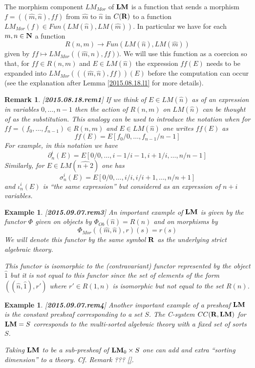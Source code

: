 \documentclass[11pt]{article}
\newtheorem{example}[proposition]{Example}
\newtheorem{remark}[proposition]{Remark}
\newcommand{\llabel}[1]{\label{#1}[{\bf #1}]}
\newcommand{\sr}{\rightarrow}
\newcommand{\nn}{{\bf N\rm}}
\newcommand{\nat}{\nn}
\newcommand{\rr}{{\bf R}}
\newcommand{\lm}{{\bf LM}}
\newcommand{\wh}{\widehat}
\begin{document}
The morphism component $LM_{Mor}$ of $\lm$ is a function that sends a morphism $f=((\wh{m},\wh{n}),ff)$ from $\wh{m}$ to $\wh{n}$ in $C(\rr)$ to a function $LM_{Mor}(f)\in Fun(LM(\wh{n}),LM(\wh{m}))$. In particular we have for each $m,n\in\nat$ a function
%
$$R(n,m)\sr Fun(LM(\wh{n}),LM(\wh{m}))$$
%
given by $ff\mapsto LM_{Mor}((\wh{m},\wh{n}),ff))$. We will use this function as a coercion so that, for $ff\in R(n,m)$ and $E\in LM(\wh{n})$ the expression $ff(E)$ needs to be expanded into $LM_{Mor}(((\wh{m},\wh{n}),ff))(E)$ before the computation can occur (see the explanation after Lemma \ref{2015.08.18.l1} for more details). 
\begin{remark}\rm
\llabel{2015.08.18.rem1}
If we think of $E\in LM(\wh{n})$ as of an expression in variables $0,\dots,n-1$ then the action of $R(n,m)$ on $LM(\wh{n})$ can be thought of as the substitution. This analogy can be used to introduce the notation when for $ff=(f_0,\dots,f_{n-1})\in R(n,m)$ and $E\in LM(\wh{n})$ one writes $ff(E)$ as 
%
$$ff(E)=E[f_0/0,\dots,f_{n-1}/n-1]$$
%
For example, in this notation we have 
%
$$\partial^i_n(E)=E[0/0,\dots,i-1/i-1,i+1/i,\dots,n/n-1]$$
%
Similarly, for $E\in LM(\wh{n+2})$ one has
%
$$\sigma^i_n(E)=E[0/0,\dots,i/i,i/i+1,\dots,n/n+1]$$
%
and $\iota_n^i(E)$ is ``the same expression'' but considered as an expression of $n+i$ variables.
\end{remark}
%
\begin{example}\rm
\llabel{2015.09.07.rem3}
An important example of $\lm$ is given by the functor $\Phi$ given on objects by $\Phi_{Ob}(\wh{n})=R(n)$ and on morphisms by 
%
$$\Phi_{Mor}((\wh{m},\wh{n}),r)(s)=r(s)$$
%
We will denote this functor by the same symbol $\rr$ as the underlying strict algebraic theory.

This functor is isomorphic to the (contravariant) functor represented by the object $\wh{1}$ but it is not equal to this functor since the set of elements of the form  $((\wh{n},\wh{1}),r')$ where $r'\in R(1,n)$ is isomorphic but not equal to the set $R(n)$.
\end{example}
%
%
\begin{example}\rm
\llabel{2015.09.07.rem4}
Another important example of a presheaf $\lm$ is the constant presheaf corresponding to a set $S$. The C-system $CC(\rr,\lm)$ for $\lm=S$ corresponds to the multi-sorted algebraic theory with a fixed set of sorts $S$. 

Taking $\lm$ to be a sub-presheaf of $\lm_0\times S$ one can add and extra ``sorting dimension'' to a theory. Cf. Remark ??? \ref{}. 
\end{example}
\end{document}
